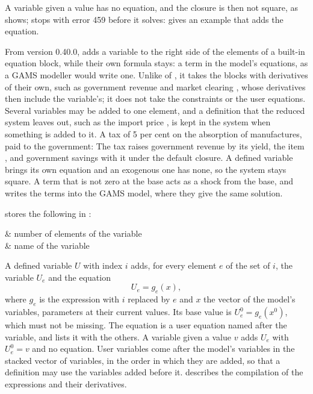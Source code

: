 
A variable given a value has no equation, and the closure is then not square,
as  shows;  stops with error 459 before it
solves:
 gives an example that adds the equation.


From version 0.40.0,  adds a variable to the right side of the
elements of a built-in equation block, while their own formula stays: a term
in the model's equations, as a GAMS modeller would write one. Unlike
 of , it takes the blocks with
derivatives of their own, such as government revenue  and market
clearing , whose derivatives then include the variable's; it does not
take the constraints or the user equations. Several variables may be added to
one element, and a definition that the reduced system leaves out, such as the
import price , is kept in the system when something is added to it.
A tax of 5 per cent on the absorption of manufactures, paid to the
government:
The tax raises government revenue by its yield, the item , and
government savings with it under the default closure. A defined variable brings its own equation and an exogenous one has
none, so the system stays square. A term that is not zero at the base acts as
a shock from the base, and  writes the terms into the GAMS
model, where they give the same solution.


 stores the following in :
\begin{storedres}
 & number of elements of the variable\\
 & name of the variable\\
\end{storedres}


A defined variable $U$ with index $i$ adds, for every element $e$ of the set of
$i$, the variable $U_e$ and the equation
\begin{equation*}
U_e = g_e(x),
\end{equation*}
where $g_e$ is the expression with $i$ replaced by $e$ and $x$ the vector of the
model's variables, parameters at their current values. Its base value is
$U^0_e = g_e(x^0)$, which must not be missing. The equation is a user equation
named after the variable, and  lists it with the
others. A variable given a value $v$ adds $U_e$ with $U^0_e = v$ and no
equation. User variables come after the model's variables in the stacked
vector of variables, in the order in which they are added, so that a
definition may use the variables added before it.  describes
the compilation of the expressions and their derivatives.

